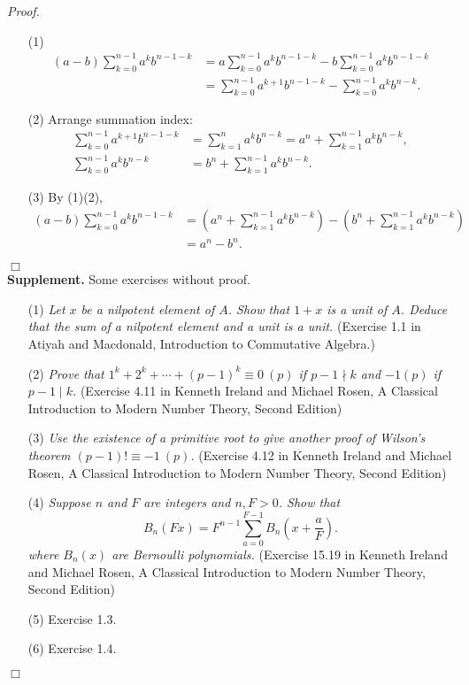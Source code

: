 \documentclass{article}
\begin{document}
\emph{Proof.}
\begin{enumerate}
\item[(1)]
\begin{align*}
(a - b) \sum_{k=0}^{n-1} a^k b^{n-1-k}
&= a \sum_{k=0}^{n-1} a^k b^{n-1-k} - b \sum_{k=0}^{n-1} a^k b^{n-1-k} \\
&= \sum_{k=0}^{n-1} a^{k+1} b^{n-1-k} - \sum_{k=0}^{n-1} a^k b^{n-k}.
\end{align*}
\item[(2)] Arrange summation index:
\begin{align*}
\sum_{k=0}^{n-1} a^{k+1} b^{n-1-k}
&= \sum_{k=1}^{n} a^{k} b^{n-k}
= a^n + \sum_{k=1}^{n-1} a^{k} b^{n-k}, \\
\sum_{k=0}^{n-1} a^k b^{n-k}
&= b^n + \sum_{k=1}^{n-1} a^{k} b^{n-k}.
\end{align*}
\item[(3)]
By (1)(2),
\begin{align*}
(a - b) \sum_{k=0}^{n-1} a^k b^{n-1-k}
&= \left( a^n + \sum_{k=1}^{n-1} a^{k} b^{n-k} \right)
- \left( b^n + \sum_{k=1}^{n-1} a^{k} b^{n-k} \right) \\
&= a^n - b^n.
\end{align*}
\end{enumerate}
$\Box$ \\

\textbf{Supplement.} Some exercises without proof.
\begin{enumerate}
\item[(1)]
\emph{Let $x$ be a nilpotent element of $A$.
Show that $1+x$ is a unit of $A$.
Deduce that the sum of a nilpotent element and a unit is a unit.}
(Exercise 1.1 in Atiyah and Macdonald,
Introduction to Commutative Algebra.)

\item[(2)]
\emph{Prove that $1^k + 2^k + \cdots + (p-1)^k \equiv 0 \: (p)$
if $p - 1 \nmid k$ and $-1 (p)$ if $p - 1 \mid k$.}
(Exercise 4.11 in Kenneth Ireland and Michael Rosen,
A Classical Introduction to Modern Number Theory, Second Edition)

\item[(3)]
\emph{Use the existence of a primitive root to give another proof
of Wilson's theorem $(p - 1)! \equiv -1 \: (p)$.}
(Exercise 4.12 in Kenneth Ireland and Michael Rosen,
A Classical Introduction to Modern Number Theory, Second Edition)

\item[(4)]
\emph{Suppose $n$ and $F$ are integers and $n, F > 0$. Show that
$$B_n(Fx) = F^{n-1} \sum_{a=0}^{F-1} B_n \left(x + \frac{a}{F} \right).$$
where $B_n(x)$ are Bernoulli polynomials.}
(Exercise 15.19 in Kenneth Ireland and Michael Rosen,
A Classical Introduction to Modern Number Theory, Second Edition)

\item[(5)]
Exercise 1.3.

\item[(6)]
Exercise 1.4.
\end{enumerate}
$\Box$ \\\\
\end{document}
